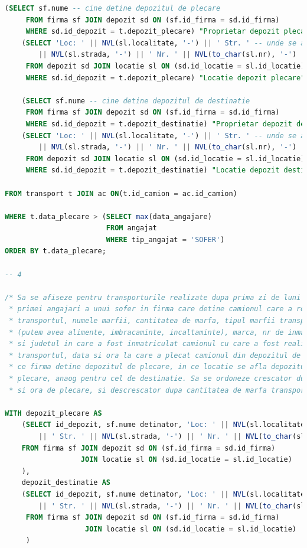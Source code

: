\documentclass[12pt, a4paper]{article}
\begin{document}
\begin{lstlisting}[language=SQL]
    (SELECT sf.nume -- cine detine depozitul de plecare
     FROM firma sf JOIN depozit sd ON (sf.id_firma = sd.id_firma)
     WHERE sd.id_depozit = t.depozit_plecare) "Proprietar depozit plecare",
    (SELECT 'Loc: ' || NVL(sl.localitate, '-') || ' Str. ' -- unde se afla depozitul
        || NVL(sl.strada, '-') || ' Nr. ' || NVL(to_char(sl.nr), '-')
     FROM depozit sd JOIN locatie sl ON (sd.id_locatie = sl.id_locatie)
     WHERE sd.id_depozit = t.depozit_plecare) "Locatie depozit plecare",

    (SELECT sf.nume -- cine detine depozitul de destinatie
     FROM firma sf JOIN depozit sd ON (sf.id_firma = sd.id_firma)
     WHERE sd.id_depozit = t.depozit_destinatie) "Proprietar depozit destinatie",
    (SELECT 'Loc: ' || NVL(sl.localitate, '-') || ' Str. ' -- unde se afla depozitul
        || NVL(sl.strada, '-') || ' Nr. ' || NVL(to_char(sl.nr), '-')
     FROM depozit sd JOIN locatie sl ON (sd.id_locatie = sl.id_locatie)
     WHERE sd.id_depozit = t.depozit_destinatie) "Locatie depozit destinatie"

FROM transport t JOIN ac ON(t.id_camion = ac.id_camion)

WHERE t.data_plecare > (SELECT max(data_angajare)
                        FROM angajat
                        WHERE tip_angajat = 'SOFER')
ORDER BY t.data_plecare;

-- 4

/* Sa se afiseze pentru transporturile realizate dupa prima zi de luni de la data
 * primei angajari a unui sofer in firma care detine camionul care a realizat
 * transportul, numele marfii, cantitatea de marfa, tipul marfii transportate
 * (putem avea alimente, imbracaminte, incaltaminte), marca, nr de inmatriculare
 * si judetul in care a fost inmatriculat camionul cu care a fost realizat
 * transportul, data si ora la care a plecat camionul din depozitul de plecare,
 * ce firma detine depozitul de plecare, in ce locatie se afla depozitul de
 * plecare, anaog pentru cel de destinatie. Sa se ordoneze crescator dupa data
 * si ora de plecare, si descrescator dupa cantitatea de marfa transportata */

WITH depozit_plecare AS
    (SELECT id_depozit, sf.nume detinator, 'Loc: ' || NVL(sl.localitate, '-')
        || ' Str. ' || NVL(sl.strada, '-') || ' Nr. ' || NVL(to_char(sl.nr), '-') locatie
    FROM firma sf JOIN depozit sd ON (sf.id_firma = sd.id_firma)
                  JOIN locatie sl ON (sd.id_locatie = sl.id_locatie)
    ),
    depozit_destinatie AS
    (SELECT id_depozit, sf.nume detinator, 'Loc: ' || NVL(sl.localitate, '-')
        || ' Str. ' || NVL(sl.strada, '-') || ' Nr. ' || NVL(to_char(sl.nr), '-') locatie
     FROM firma sf JOIN depozit sd ON (sf.id_firma = sd.id_firma)
                   JOIN locatie sl ON (sd.id_locatie = sl.id_locatie)
     )


\end{lstlisting}
\end{document}
